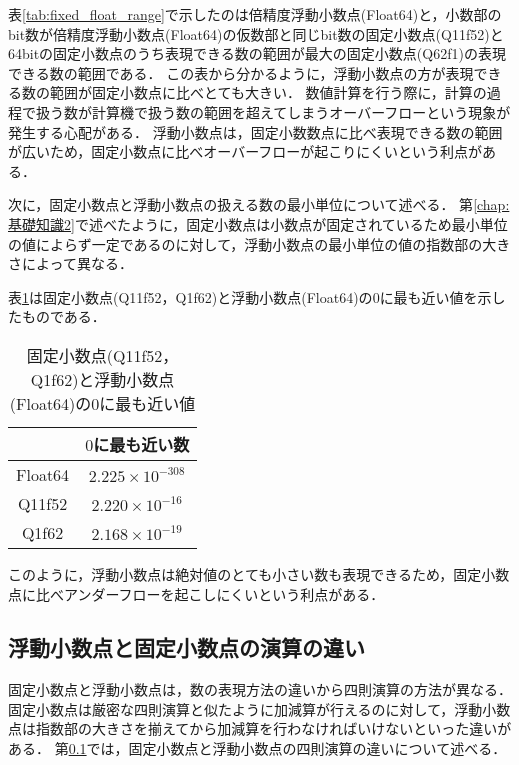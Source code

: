 表\ref{tab:fixed_float_range}で示したのは倍精度浮動小数点(Float64)と，小数部のbit数が倍精度浮動小数点(Float64)の仮数部と同じbit数の固定小数点(Q11f52)と64bitの固定小数点のうち表現できる数の範囲が最大の固定小数点(Q62f1)の表現できる数の範囲である．
この表から分かるように，浮動小数点の方が表現できる数の範囲が固定小数点に比べとても大きい．
数値計算を行う際に，計算の過程で扱う数が計算機で扱う数の範囲を超えてしまうオーバーフローという現象が発生する心配がある．
浮動小数点は，固定小数数点に比べ表現できる数の範囲が広いため，固定小数点に比べオーバーフローが起こりにくいという利点がある．

次に，固定小数点と浮動小数点の扱える数の最小単位について述べる．
第\ref{chap:基礎知識2}で述べたように，固定小数点は小数点が固定されているため最小単位の値によらず一定であるのに対して，浮動小数点の最小単位の値の指数部の大きさによって異なる．

表\ref{tab:fixed_float_zero_error}は固定小数点(Q11f52，Q1f62)と浮動小数点(Float64)の$0$に最も近い値を示したものである．

\begin{table}[H]
    \centering
    \caption{固定小数点(Q11f52，Q1f62)と浮動小数点(Float64)の$0$に最も近い値}
    \begin{tabular}{c|c}
        & $0$に最も近い数 \\ \hline \hline
        Float64 & $2.225 \times 10^{-308}$\\
        Q11f52  & $2.220 \times 10^{-16}$\\
        Q1f62   & $2.168 \times 10^{-19} $
    \end{tabular}
    \label{tab:fixed_float_zero_error}
\end{table}

このように，浮動小数点は絶対値のとても小さい数も表現できるため，固定小数点に比べアンダーフローを起こしにくいという利点がある．

\subsection{浮動小数点と固定小数点の演算の違い}
\label{sec:dif_arithmetic}
\begin{comment} %
    計算機の中で主に演算を行うのはCPU(Central Processing Unit)である．
    固定小数点と浮動小数点では，演算におけるCPUへの負担が異なり浮動小数点の方が負荷が大きい．
    そのため，かつてはCPUの性能が低く浮動小数点を専門に扱うためのFPU(Floating Point Unit)を用いて浮動小数点演算を行なっていた．
    現代では，CPUの性能が向上したためFPUの機能はCPU自体に組み込まれていることが多い．
    しかし，浮動小数点演算を組み込まずに固定小数点演算を行うような計算機があれば，計算の負荷を少なくすることが可能である．
    以下では，固定小数点と浮動小数点の演算の違いについて述べる．
\end{comment}
固定小数点と浮動小数点は，数の表現方法の違いから四則演算の方法が異なる．
固定小数点は厳密な四則演算と似たように加減算が行えるのに対して，浮動小数点は指数部の大きさを揃えてから加減算を行わなければいけないといった違いがある．
第\ref{sec:dif_arithmetic}では，固定小数点と浮動小数点の四則演算の違いについて述べる．

